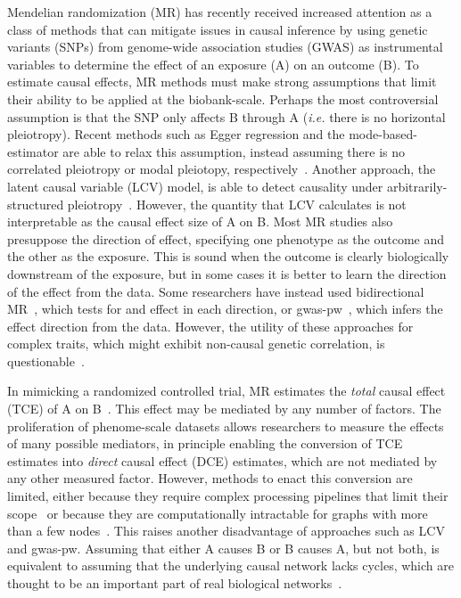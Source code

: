 \documentclass{article}
\begin{document}
Mendelian randomization (MR) has recently received increased attention as a class of methods
that can mitigate issues in causal inference
 by using genetic variants (SNPs) from genome-wide
association studies (GWAS) as instrumental variables to determine the effect
of an exposure (A) on an outcome (B). To estimate causal effects,
MR methods must make strong assumptions that limit their
ability to be applied at the biobank-scale. Perhaps the most
controversial assumption is that the SNP only affects B through A
(\textit{i.e.} there is no horizontal pleiotropy). Recent methods such as Egger
regression and the mode-based-estimator are able to relax this assumption, instead
assuming there is no correlated pleiotropy or modal pleiotopy, respectively~\cite{Bowden2015,Hartwig2017}.
Another approach, the latent causal variable (LCV) model, is able to detect causality
under arbitrarily-structured pleiotropy~\cite{OConnor2018}. However, the quantity that LCV
calculates is not interpretable as the causal effect size of A on B. Most MR studies
also presuppose the direction of effect, specifying one phenotype as the outcome and
the other as the exposure. This is sound when the outcome
is clearly biologically downstream of the exposure, but in some cases it is better
to learn the direction of the effect from the data.
Some researchers have instead used bidirectional MR~\cite{Timpson2011, Richmond2014}, which tests for
and effect in each direction, or gwas-pw~\cite{Pickrell2016}, which infers the effect
direction from the data.
However, the utility of these approaches for complex traits,
which might exhibit non-causal genetic correlation,
is questionable~\cite{OConnor2018}.

In mimicking a randomized controlled trial, MR estimates the
\emph{total} causal effect (TCE) of A on B~\cite{Burgess2015}. This effect may be mediated by
any number of factors. The proliferation of phenome-scale datasets
allows researchers to measure the effects of many possible mediators,
in principle enabling the conversion of TCE estimates into \emph{direct} causal effect (DCE)
estimates, which are not mediated by any other measured factor.
However, methods to enact this conversion are limited, either because they require complex
processing pipelines that limit their scope~\cite{Amar2019} or because they are
computationally intractable for graphs with more than a few nodes~\cite{Badsha2019}.
This raises another disadvantage of approaches such as LCV and gwas-pw. Assuming that either
A causes B or B causes A, but not both, is equivalent to assuming
that the underlying causal network
lacks cycles, which are thought to be an important part of real biological networks~\cite{Zhu2007}.
\end{document}

